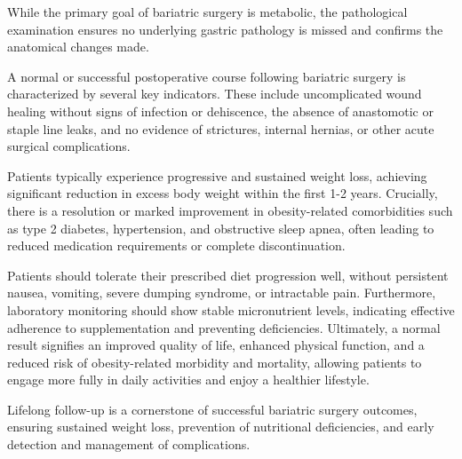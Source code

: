 While the primary goal of bariatric surgery is metabolic, the pathological examination ensures no underlying gastric pathology is missed and confirms the anatomical changes made.

A normal or successful postoperative course following bariatric surgery is characterized by several key indicators. These include uncomplicated wound healing without signs of infection or dehiscence, the absence of anastomotic or staple line leaks, and no evidence of strictures, internal hernias, or other acute surgical complications. 

Patients typically experience progressive and sustained weight loss, achieving significant reduction in excess body weight within the first 1-2 years. Crucially, there is a resolution or marked improvement in obesity-related comorbidities such as type 2 diabetes, hypertension, and obstructive sleep apnea, often leading to reduced medication requirements or complete discontinuation. 

Patients should tolerate their prescribed diet progression well, without persistent nausea, vomiting, severe dumping syndrome, or intractable pain. Furthermore, laboratory monitoring should show stable micronutrient levels, indicating effective adherence to supplementation and preventing deficiencies. Ultimately, a normal result signifies an improved quality of life, enhanced physical function, and a reduced risk of obesity-related morbidity and mortality, allowing patients to engage more fully in daily activities and enjoy a healthier lifestyle.

Lifelong follow-up is a cornerstone of successful bariatric surgery outcomes, ensuring sustained weight loss, prevention of nutritional deficiencies, and early detection and management of complications.

